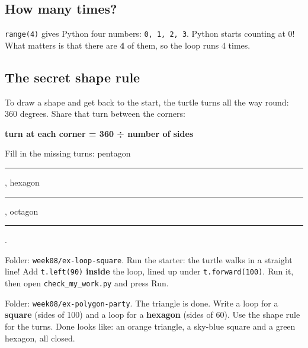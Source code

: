 \subsection{How many times?}
\texttt{range(4)} gives Python four numbers: \texttt{0, 1, 2, 3}. Python starts counting at 0! What matters is that there are \textbf{4} of them, so the loop runs 4 times.

\subsection{The secret shape rule}
To draw a shape and get back to the start, the turtle turns all the way round: 360 degrees. Share that turn between the corners:
\begin{center}
\textbf{turn at each corner = 360 ÷ number of sides}
\end{center}
\begin{center}
\end{center}
Fill in the missing turns: pentagon \rule{1.2cm}{0.4pt}, hexagon \rule{1.2cm}{0.4pt}, octagon \rule{1.2cm}{0.4pt}.

\begin{exercise}
Folder: \texttt{week08/ex-loop-square}. Run the starter: the turtle walks in a straight line! Add \texttt{t.left(90)} \textbf{inside} the loop, lined up under \texttt{t.forward(100)}. Run it, then open \texttt{check\_my\_work.py} and press Run.
\end{exercise}

\begin{exercise}
Folder: \texttt{week08/ex-polygon-party}. The triangle is done. Write a loop for a \textbf{square} (sides of 100) and a loop for a \textbf{hexagon} (sides of 60). Use the shape rule for the turns.
Done looks like: an orange triangle, a sky-blue square and a green hexagon, all closed.
\end{exercise}


